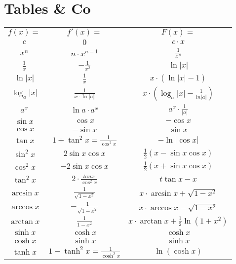 \chapter{Tables \& Co}
  \begin{example}
  	\renewcommand{\arraystretch}{1.5}
    \begin{tabular}{| c | c | c |}
          \hline 
      $f(x) = $ & $f'(x) = $ & $F(x) = $\\ %
          \hhline{|=|=|=|}
      $c$ & $0$ & $c\cdot x$\\
          \hline
      $x^n$ & $n\cdot x^{n-1}$ & $\frac{1}{x^n}$\\
          \hline
      $\frac{1}{x}$ & $-\frac{1}{x^2}$ & $\ln{|x|}$\\
          \hline
      $\ln{|x|}$ & $\frac{1}{x}$ & $x \cdot (\ln{|x|}-1)$\\
          \hline
      $\log_a{|x|}$ & $\frac{1}{x \cdot \ln{|a|}}$ & $x \cdot (\log_a{|x|}-\frac{1}{ln{|a|}})$\\
          \hline
      $a^x$ & $\ln a\cdot a^x$ & $a^x \cdot \frac{1}{|a|}$\\
          \hline
      $\sin x$ & $\cos x$ & $-\cos x$\\
          \hline
      $\cos x$ & $-\sin x$ & $\sin x$\\
          \hline
      $\tan x$ & $1 + \tan^2 x = \frac{1}{\cos^2 x}$ & $-\ln|\cos x|$\\
          \hline
      $\sin^2 x$ & $2\sin x\cos x$ & $\frac{1}{2}(x-\sin x\cos x)$\\
          \hline
      $\cos^2 x$ & $-2\sin x\cos x$ & $\frac{1}{2}(x+\sin x\cos x)$\\
          \hline
      $\tan^2 x$ & $2 \cdot \frac{tan x}{\cos^2 x}$ & $t\tan x - x$\\
          \hline
      $\arcsin x$ & $\frac{1}{\sqrt{1-x^2}}$ & $x \cdot \arcsin{x} + \sqrt{1-x^2}$\\
          \hline
      $\arccos x$ & $-\frac{1}{\sqrt{1-x^2}}$ & $x \cdot \arccos{x} - \sqrt{1-x^2}$\\
          \hline
      $\arctan x$ & $\frac{1}{1-x^2}$ & $x \cdot \arctan{x} + \frac{1}{2}\ln{(1+x^2)}$\\
          \hline
      $\sinh x$ & $\cosh x$ & $\cosh x$\\
          \hline
      $\cosh x$ & $\sinh x$ & $\sinh x$\\
          \hline
      $\tanh x$ & $1 - \tanh^2 x = \frac{1}{\cosh^2 x}$ & $\ln{(\cosh x)}$\\
          \hline
    \end{tabular}
  \end{example}
  
